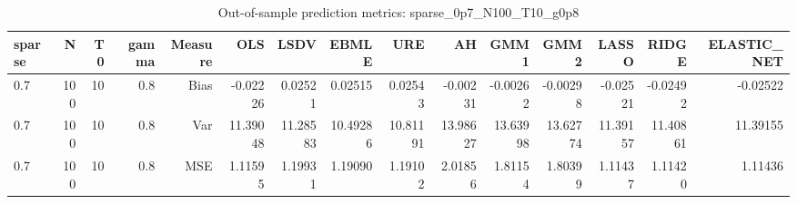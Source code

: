 \begin{table}[!htbp]\centering
\caption{Out-of-sample prediction metrics: sparse_0p7_N100_T10_g0p8}
\label{tab:table3_sparse_0p7_N100_T10_g0p8}
\begin{tabular}{lrrrrrrrrrrrrrr}
\hline
sparse & N & T0 & gamma & Measure & OLS & LSDV & EBMLE & URE & AH & GMM1 & GMM2 & LASSO & RIDGE & ELASTIC_NET \\
\hline
0.7 & 100 & 10 & 0.8 & Bias & -0.02226 & 0.02521 & 0.02515 & 0.02543 & -0.00231 & -0.00262 & -0.00298 & -0.02521 & -0.02492 & -0.02522 \\
0.7 & 100 & 10 & 0.8 & Var & 11.39048 & 11.28583 & 10.49286 & 10.81191 & 13.98627 & 13.63998 & 13.62774 & 11.39157 & 11.40861 & 11.39155 \\
0.7 & 100 & 10 & 0.8 & MSE & 1.11595 & 1.19931 & 1.19090 & 1.19102 & 2.01856 & 1.81154 & 1.80399 & 1.11437 & 1.11420 & 1.11436 \\
\hline
\end{tabular}
\end{table}

